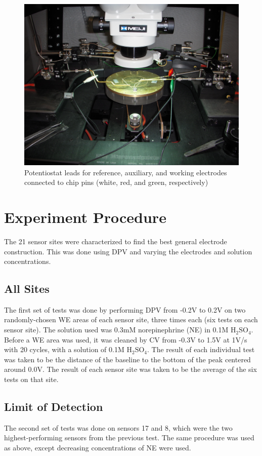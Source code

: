 \begin{figure}
	\centering
	\includegraphics[width=0.5\linewidth]{figures/potentiostatleads.png}
	\caption[Potentiostat leads connected to pins]{Potentiostat leads for reference, auxiliary, and working electrodes connected to chip pins (white, red, and green, respectively)}
	\label{potentiostatleads}
\end{figure}

\section{Experiment Procedure}

The 21 sensor sites were characterized to find the best general electrode construction. This was done using DPV and varying the electrodes and solution concentrations.

\subsection{All Sites}

The first set of tests was done by performing DPV from -0.2V to 0.2V on two randomly-chosen WE areas of each sensor site, three times each (six tests on each sensor site). The solution used was 0.3mM norepinephrine (NE) in 0.1M $\mathrm{H}_2\mathrm{SO}_4$. Before a WE area was used, it was cleaned by CV from -0.3V to 1.5V at 1V/s with 20 cycles, with a solution of 0.1M $\mathrm{H}_2\mathrm{SO}_4$. The result of each individual test was taken to be the distance of the baseline to the bottom of the peak centered around 0.0V. The result of each sensor site was taken to be the average of the six tests on that site.

\subsection{Limit of Detection}

The second set of tests was done on sensors 17 and 8, which were the two highest-performing sensors from the previous test. The same procedure was used as above, except decreasing concentrations of NE were used.

